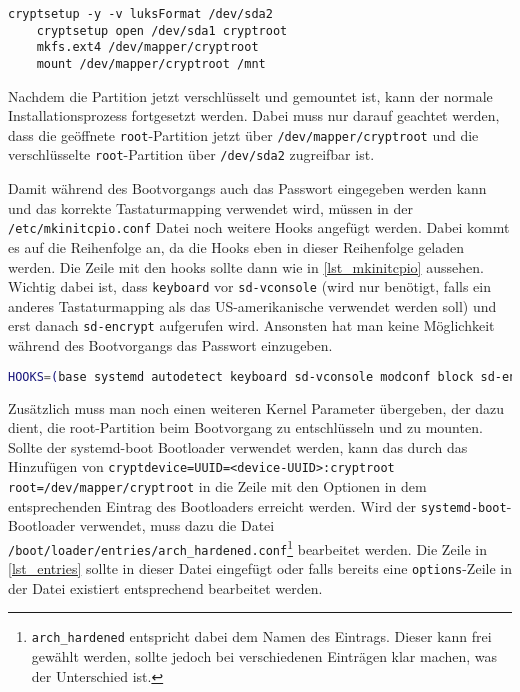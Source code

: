 \begin{lstlisting}[caption=Verschlüsselungsvorgang, label=lst_enc]
	cryptsetup -y -v luksFormat /dev/sda2
	cryptsetup open /dev/sda1 cryptroot
	mkfs.ext4 /dev/mapper/cryptroot
	mount /dev/mapper/cryptroot /mnt
\end{lstlisting}

Nachdem die Partition jetzt verschlüsselt und gemountet ist, kann der normale Installationsprozess fortgesetzt werden. Dabei muss nur darauf geachtet werden, dass die geöffnete \texttt{root}-Partition jetzt über \texttt{/dev/mapper/cryptroot} und die verschlüsselte \texttt{root}-Partition über \texttt{/dev/sda2} zugreifbar ist.

Damit während des Bootvorgangs auch das Passwort eingegeben werden kann und das korrekte Tastaturmapping verwendet wird, müssen in der \texttt{/etc/mkinitcpio.conf} Datei noch weitere Hooks angefügt werden. Dabei kommt es auf die Reihenfolge an, da die Hooks eben in dieser Reihenfolge geladen werden. Die Zeile mit den hooks sollte dann wie in \autoref{lst_mkinitcpio} aussehen. Wichtig dabei ist, dass \texttt{keyboard} vor \texttt{sd-vconsole} {\small(wird nur benötigt, falls ein anderes Tastaturmapping als das US-amerikanische verwendet werden soll)} und erst danach \texttt{sd-encrypt} aufgerufen wird. Ansonsten hat man keine Möglichkeit während des Bootvorgangs das Passwort einzugeben.\cite{DmcryptEncryptingEntire}

\begin{lstlisting}[language=bash, caption=mkinitcpio.conf Hooks, label=lst_mkinitcpio]
	HOOKS=(base systemd autodetect keyboard sd-vconsole modconf block sd-encrypt filesystems fsck)
\end{lstlisting}

Zusätzlich muss man noch einen weiteren Kernel Parameter übergeben, der dazu dient, die root-Partition beim Bootvorgang zu entschlüsseln und zu mounten. Sollte der systemd-boot Bootloader verwendet werden, kann das durch das Hinzufügen von \texttt{cryptdevice=UUID=<device-UUID>:cryptroot root=/dev/mapper/cryptroot} in die Zeile mit den Optionen in dem entsprechenden Eintrag des Bootloaders erreicht werden.\cite{DmcryptEncryptingEntire} Wird der \texttt{systemd-boot}-Bootloader verwendet, muss dazu die Datei \texttt{/boot/loader/entries/arch\_hardened.conf}\footnote{\texttt{arch\_hardened} entspricht dabei dem Namen des Eintrags. Dieser kann frei gewählt werden, sollte jedoch bei verschiedenen Einträgen klar machen, was der Unterschied ist.} bearbeitet werden. Die Zeile in \autoref{lst_entries} sollte in dieser Datei eingefügt oder falls bereits eine \texttt{options}-Zeile in der Datei existiert entsprechend bearbeitet werden.\cite{DmcryptEncryptingEntire}

